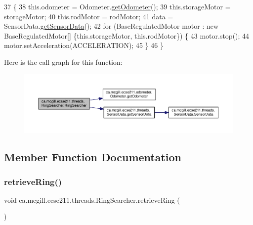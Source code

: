 \begin{DoxyCode}
37                                 \{
38     this.odometer = Odometer.\hyperlink{classca_1_1mcgill_1_1ecse211_1_1odometer_1_1_odometer_a99171f11e34dea918fa9dd069d721439}{getOdometer}();
39     this.storageMotor = storageMotor;
40     this.rodMotor = rodMotor;
41     data = SensorData.\hyperlink{classca_1_1mcgill_1_1ecse211_1_1threads_1_1_sensor_data_a8260aba53b4474ca1275e4ce26157977}{getSensorData}();
42     \textcolor{keywordflow}{for} (BaseRegulatedMotor motor : \textcolor{keyword}{new} BaseRegulatedMotor[] \{this.storageMotor, this.rodMotor\}) \{
43       motor.stop();
44       motor.setAcceleration(ACCELERATION);
45     \}
46   \}
\end{DoxyCode}
Here is the call graph for this function\+:\nopagebreak
\begin{figure}[H]
\begin{center}
\leavevmode
\includegraphics[width=350pt]{classca_1_1mcgill_1_1ecse211_1_1threads_1_1_ring_searcher_a58fdaba16c2b961446d1474b76e66e49_cgraph}
\end{center}
\end{figure}


\subsection{Member Function Documentation}
\mbox{\label{classca_1_1mcgill_1_1ecse211_1_1threads_1_1_ring_searcher_abd7a2651a7c5de76a018664c8bf327af}} 
\subsubsection{\texorpdfstring{retrieve\+Ring()}{retrieveRing()}}
{\footnotesize\ttfamily void ca.\+mcgill.\+ecse211.\+threads.\+Ring\+Searcher.\+retrieve\+Ring (\begin{DoxyParamCaption}{ }\end{DoxyParamCaption})}

